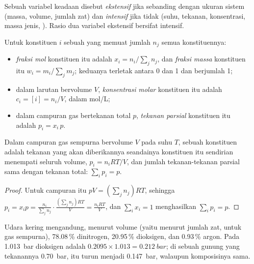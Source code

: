 \begin{definition}\label{def:b1:extent-q-and-k:variables}
Sebuah variabel keadaan disebut \emph{ekstensif}
jika sebanding dengan ukuran sistem (massa, volume, jumlah zat) dan
\emph{intensif} jika tidak (suhu, tekanan,
konsentrasi, massa jenis, ). Rasio dua variabel ekstensif
bersifat intensif.
\end{definition}

\begin{definition}\label{def:b1:extent-q-and-k:composition}
Untuk konstituen $i$ sebuah  yang memuat jumlah $n_j$ semua
konstituennya:
\begin{itemize}
  \item \emph{fraksi mol} konstituen itu adalah $x_i = n_i/\sum_j
        n_j$, dan \emph{fraksi massa} konstituen itu $w_i =
        m_i/\sum_j m_j$; keduanya terletak antara 0 dan 1 dan berjumlah 1;
  \item dalam larutan bervolume $V$, \emph{konsentrasi
        molar} konstituen itu adalah $c_i = [i] = n_i/V$,
        dalam \unit{mol/L};
  \item dalam campuran gas bertekanan total $p$, \emph{tekanan
        parsial} konstituen itu adalah $p_i = x_i\,p$.
\end{itemize}
\end{definition}

\begin{proposition}\label{prop:b1:extent-q-and-k:dalton}
Dalam campuran gas sempurna bervolume $V$ pada suhu $T$, 
sebuah konstituen adalah tekanan yang akan diberikannya seandainya
konstituen itu sendirian menempati seluruh volume, $p_i = n_iRT/V$, dan
jumlah tekanan-tekanan parsial sama dengan tekanan total: $\sum_i p_i = p$.
\end{proposition}

\begin{proof}
Untuk campuran itu $pV = (\sum_j n_j)RT$, sehingga $p_i = x_i p = \frac{n_i}{\sum_j
n_j}\cdot\frac{(\sum_j n_j)RT}{V} = \frac{n_iRT}{V}$, dan $\sum_i x_i = 1$
menghasilkan $\sum_i p_i = p$.
\end{proof}

\begin{example}[Udara]\label{ex:b1:extent-q-and-k:air}
Udara kering mengandung, menurut volume (yaitu menurut jumlah zat, untuk
gas sempurna), 78.08\,\% dinitrogen, 20.95\,\% dioksigen, dan 0.93\,\%
argon. Pada \qty{1.013}{bar}  dioksigen adalah $0.2095 \times
1.013 = \qty{0.212}{bar}$; di sebuah gunung yang tekanannya
\qty{0.70}{bar},  itu turun menjadi \qty{0.147}{bar},
walaupun komposisinya sama.
\end{example}

